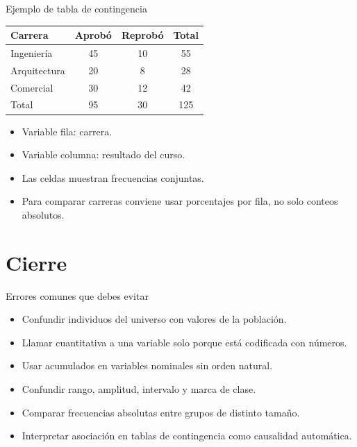 \documentclass[aspectratio=169,11pt]{beamer}
\begin{document}
\begin{frame}{Ejemplo de tabla de contingencia}
\centering
\begin{tabular}{lccc}
\toprule
Carrera & Aprobó & Reprobó & Total \\
\midrule
Ingeniería & 45 & 10 & 55 \\
Arquitectura & 20 & 8 & 28 \\
Comercial & 30 & 12 & 42 \\
\midrule
Total & 95 & 30 & 125 \\
\bottomrule
\end{tabular}
\vspace{0.7em}
\begin{itemize}
  \item Variable fila: carrera.
  \item Variable columna: resultado del curso.
  \item Las celdas muestran frecuencias conjuntas.
  \item Para comparar carreras conviene usar porcentajes por fila, no solo conteos absolutos.
\end{itemize}
\end{frame}

\section{Cierre}

\begin{frame}{Errores comunes que debes evitar}
\begin{itemize}
  \item Confundir individuos del universo con valores de la población.
  \item Llamar cuantitativa a una variable solo porque está codificada con números.
  \item Usar acumulados en variables nominales sin orden natural.
  \item Confundir rango, amplitud, intervalo y marca de clase.
  \item Comparar frecuencias absolutas entre grupos de distinto tamaño.
  \item Interpretar asociación en tablas de contingencia como causalidad automática.
\end{itemize}
\end{frame}
\end{document}
